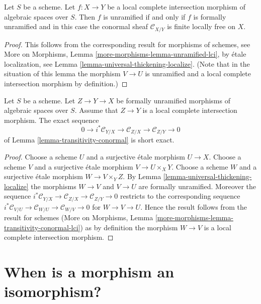 \begin{lemma}
\label{lemma-unramified-lci}
Let $S$ be a scheme. Let $f : X \to Y$ be a local complete intersection
morphism of algebraic spaces over $S$. Then $f$ is unramified if and only
if $f$ is formally unramified and in this case the conormal sheaf
$\mathcal{C}_{X/Y}$ is finite locally free on $X$.
\end{lemma}

\begin{proof}
This follows from the corresponding result for morphisms of schemes, see
More on Morphisms, Lemma \ref{more-morphisms-lemma-unramified-lci},
by \'etale localization, see
Lemma \ref{lemma-universal-thickening-localize}.
(Note that in the situation of this lemma the morphism $V \to U$
is unramified and a local complete intersection morphism by definition.)
\end{proof}

\begin{lemma}
\label{lemma-transitivity-conormal-lci}
Let $S$ be a scheme. Let $Z \to Y \to X$ be formally unramified morphisms
of algebraic spaces over $S$. Assume that $Z \to Y$ is a local complete
intersection morphism. The exact sequence
$$
0 \to i^*\mathcal{C}_{Y/X} \to
\mathcal{C}_{Z/X} \to
\mathcal{C}_{Z/Y} \to 0
$$
of
Lemma \ref{lemma-transitivity-conormal}
is short exact.
\end{lemma}

\begin{proof}
Choose a scheme $U$ and a surjective \'etale morphism $U \to X$.
Choose a scheme $V$ and a surjective \'etale morphism $V \to U \times_X Y$.
Choose a scheme $W$ and a surjective \'etale morphism $W \to V \times_Y Z$.
By
Lemma \ref{lemma-universal-thickening-localize}
the morphisms $W \to V$ and $V \to U$ are formally unramified.
Moreover the sequence
$i^*\mathcal{C}_{Y/X} \to \mathcal{C}_{Z/X} \to \mathcal{C}_{Z/Y} \to 0$
restricts to the corresponding sequence
$i^*\mathcal{C}_{V/U} \to \mathcal{C}_{W/U} \to \mathcal{C}_{W/V} \to 0$
for $W \to V \to U$. Hence the result follows from the result for schemes
(More on Morphisms, Lemma \ref{more-morphisms-lemma-transitivity-conormal-lci})
as by definition the morphism $W \to V$ is a local complete intersection
morphism.
\end{proof}









\section{When is a morphism an isomorphism?}
\label{section-when-isomorphism}

